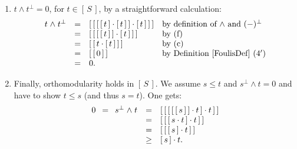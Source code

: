 \documentclass{article}
\newcommand{\conjun}{\mathrel{\wedge}}
\newcommand{\sai}[1]{[\,#1\,]}
\begin{document}
{\begin{enumerate}
\begin{itemize}
\item If also $s\in \sai{S}$ satisfies $s \leq t_{1}$ and $s\leq t_{2}$,
\textit{i.e.}~$s\cdot t_{1} = s = s\cdot t_{2}$, then, by
Definition~\ref{FoulisDef}~$(4')$,
$$\begin{array}{rcl}
\sai{t_1}\cdot t_{2}\cdot s
\hspace*{\arraycolsep} = \hspace*{\arraycolsep}
\big(s^{\dag} \cdot t_{2}^{\dag} \cdot \sai{t_1}^{\dag}\big)^{\dag}
& = &
\big(s \cdot t_{2} \cdot \sai{t_1}\big)^{\dag} \\
& = &
\big(s \cdot t_{1} \cdot \sai{t_1}\big)^{\dag} \\
& = &
(s \cdot 0)^{\dag} \\
& = &
0.
\end{array}$$

\noindent Hence $\sai{\sai{t_1}\cdot t_2}\cdot s = s$ by~(a). Then:
$$\begin{array}{rcl}
s\cdot r
& = &
s\cdot \sai{\sai{t_1}\cdot t_2}\cdot t_{2} \\
& = &
s^{\dag}\cdot \sai{\sai{t_1}\cdot t_2}^{\dag}\cdot t_{2} \\
& = &
\big(\sai{\sai{t_1}\cdot t_2}\cdot s\big)^{\dag} \cdot t_{2} \\
& = &
s^{\dag}\cdot t_{2} \\
& = &
s\cdot t_{2} \\
& = &
s.
\end{array}$$

\noindent Hence $s\leq r \leq \sai{\sai{r}}$.
\end{itemize}

\item $t\conjun t^{\perp} = 0$, for $t\in \sai{S}$, by a straightforward
calculation:
$$\begin{array}{rcll}
t \conjun t^{\perp}
& = &
\sai{\sai{\sai{\sai{t}\cdot \sai{t}}\cdot \sai{t}}} 
   & \mbox{by definition of $\conjun$ and $(-)^{\perp}$} \\
& = &
\sai{\sai{\sai{\sai{t}}\cdot \sai{t}}} & \mbox{by~(f)} \\
& = &
\sai{\sai{t\cdot \sai{t}}} & \mbox{by~(c)} \\
& = &
\sai{\sai{0}} & \mbox{by Definition~\ref{FoulisDef}~$(4')$} \\
& = &
0.
\end{array}$$

\item Finally, orthomodularity holds in $\sai{S}$. We assume $s\leq t$
  and $s^{\perp}\conjun t=0$ and have to show $t\leq s$ (and thus
  $s=t$). One gets:
$$\begin{array}{rcl}
0
\hspace*{\arraycolsep} = \hspace*{\arraycolsep}
s^{\perp}\conjun t
& = &
\sai{\sai{\sai{\sai{\sai{s}}\cdot t}\cdot t}} \\
& = &
\sai{\sai{\sai{s\cdot t}\cdot t}} \\
& = &
\sai{\sai{\sai{s}\cdot t}} \\
& \geq &
\sai{s}\cdot t.
\end{array}$$


\end{enumerate}}
\end{document}
